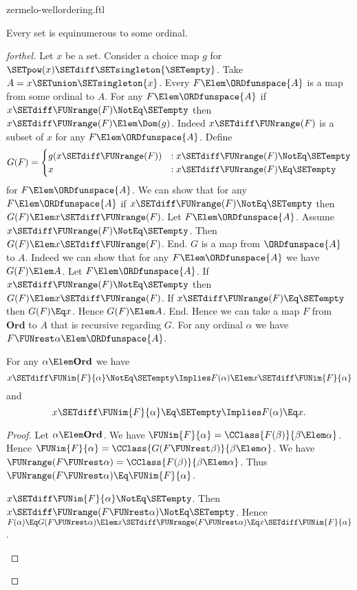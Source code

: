 \documentclass{stex}
\newcommand\Ord{\textbf{Ord}}
\begin{document}
\begin{smodule}{zermelo-wellordering.ftl}
\begin{theorem}[forthel,title=Zermelo's Well-Ordering Theorem,name=Zermelo]
  Every set is equinumerous to some ordinal.
\end{theorem}
\begin{proof}[forthel]
  Let $x$ be a set.
  Consider a choice map $g$ for $\SETpow(x) \SETdiff \SETsingleton{\SETempty}$.
  Take $A = x \SETunion \SETsingleton{x}$.
  Every $F \Elem \ORDfunspace{A}$ is a map from some ordinal to $A$.
  For any $F \Elem \ORDfunspace{A}$ if $x \SETdiff \FUNrange(F) \NotEq \SETempty$ then $x \SETdiff \FUNrange(F) \Elem \Dom(g)$.
  Indeed $x \SETdiff \FUNrange(F)$ is a subset of $x$ for any $F \Elem \ORDfunspace{A}$.
  Define \[ G(F) =
    \begin{cases}
      g(x \SETdiff \FUNrange(F))
      & : x \SETdiff \FUNrange(F) \NotEq \SETempty
      \\
      x
      & : x \SETdiff \FUNrange(F) \Eq \SETempty
    \end{cases} \]
  for $F \Elem \ORDfunspace{A}$.
  We can show that for any $F \Elem \ORDfunspace{A}$ if $x \SETdiff \FUNrange(F) \NotEq \SETempty$ then $G(F) \Elem x \SETdiff \FUNrange(F)$.
    Let $F \Elem \ORDfunspace{A}$.
    Assume $x \SETdiff \FUNrange(F) \NotEq \SETempty$.  
    Then $G(F) \Elem x \SETdiff \FUNrange(F)$.
  End.
  $G$ is a map from $\ORDfunspace{A}$ to $A$.
  Indeed we can show that for any $F \Elem \ORDfunspace{A}$ we have $G(F) \Elem A$.
    Let $F \Elem \ORDfunspace{A}$.
    If $x \SETdiff \FUNrange(F) \NotEq \SETempty$ then $G(F) \Elem x \SETdiff \FUNrange(F)$.
    If $x \SETdiff \FUNrange(F) \Eq \SETempty$ then $G(F) \Eq x$.
    Hence $G(F) \Elem A$.
  End.
  Hence we can take a map $F$ from $\Ord$ to $A$ that is recursive regarding $G$.
  For any ordinal $\alpha$ we have $F \FUNrest \alpha \Elem \ORDfunspace{A}$.

  For any $\alpha \Elem \Ord$ we have
  \[ x \SETdiff \FUNim{F}{\alpha} \NotEq \SETempty \Implies F(\alpha) \Elem x \SETdiff \FUNim{F}{\alpha} \]
  and
  \[ x \SETdiff \FUNim{F}{\alpha} \Eq \SETempty \Implies F(\alpha) \Eq x. \]
  \begin{proof}
    Let $\alpha \Elem \Ord$.
    We have $\FUNim{F}{\alpha} = \CClass{F(\beta)}{\beta \Elem \alpha}$.
    Hence $\FUNim{F}{\alpha} = \CClass{G(F \FUNrest \beta)}{\beta \Elem \alpha}$.
    We have $\FUNrange(F \FUNrest \alpha) = \CClass{F(\beta)}{\beta \Elem \alpha}$.
    Thus $\FUNrange(F \FUNrest \alpha) \Eq \FUNim{F}{\alpha}$.

    \begin{case}{$x \SETdiff \FUNim{F}{\alpha} \NotEq \SETempty$.}
      Then $x \SETdiff \FUNrange(F \FUNrest \alpha) \NotEq \SETempty$.
      Hence $F(\alpha)
        \Eq G(F \FUNrest \alpha)
        \Elem x \SETdiff \FUNrange(F \FUNrest \alpha)
        \Eq x \SETdiff \FUNim{F}{\alpha}$.
    \end{case}


\end{proof}
\end{proof}
\end{smodule}
\end{document}
